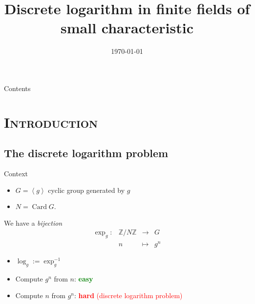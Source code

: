 \documentclass[xcolor=x11names,compress]{beamer}
\theoremstyle{break}
\theoremstyle{sc}
\theoremstyle{definition}
\theoremstyle{remark}
\DeclareMathOperator{\Card}{Card}
\begin{document}
\begin{frame}
  \title{Discrete logarithm in finite fields of small characteristic}
  \author{}
\date{\today}
\titlepage
\end{frame}

\begin{frame}{Contents}
\tableofcontents
\end{frame}

\section{\scshape Introduction}
\subsection{The discrete logarithm problem}
\begin{frame}{Context}
  \begin{itemize}
    \item $G=\left\langle g \right\rangle$ cyclic group generated by $g$
    \item $N=\Card G$.
    \end{itemize}
  
  We have a \emph{bijection}
  \[
    \begin{array}{cccc}
      \exp_g: & \mathbb{Z}/N\mathbb{Z} & \to & G \\
      & n & \mapsto & g^n
    \end{array}
  \]

  \begin{itemize}
    \item $\log_g:=\exp_g^{-1}$
   \item Compute $g^n$ from $n$: \textcolor{green}{\bf easy}
    \item Compute $n$ from $g^n$: \textcolor{red}{\textbf{hard} (discrete
    logarithm problem)}
  \end{itemize}
\end{frame}
\end{document}
